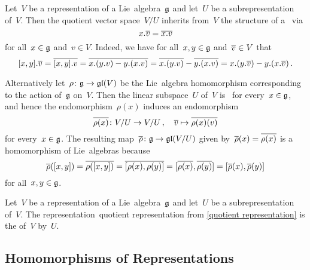 \begin{example}
  \label{quotient representation}
  Let~$V$ be a representation of a Lie~algebra~$\glie$ and let~$U$ be a subrepresentation of~$V$.
  Then the quotient vector space~$V/U$ inherits from~$V$ the structure of a~{\representation{$\glie$}} via
  \[
    x.\overline{v}
    =
    \overline{x.v}
  \]
  for all~$x \in \mathfrak{g}$ and~$v \in V$.
  Indeed, we have for all~$x, y \in \mathfrak{g}$ and~$\overline{v} \in V$ that
  \[
    [x,y].\overline{v}
    =
    \overline{[x,y].v}
    =
    \overline{x.(y.v) - y.(x.v)}
    =
    \overline{x.(y.v)} - \overline{y.(x.v)}
    =
    x.(y.\overline{v}) - y.(x.\overline{v}) \,.
  \]
  
  Alternatively let~$\rho \colon \mathfrak{g} \to \mathfrak{gl}(V)$ be the Lie~algebra homomorphism corresponding to the action of~$\glie$ on~$V$.
  Then the linear subspace~$U$ of~$V$ is~{} for every~$x \in \mathfrak{g}$, and hence the endomorphism~$\rho(x)$ induces an endomorphism
  \[
    \overline{\rho(x)}
    \colon
    V/U
    \to
    V/U \,,
    \quad
    \overline{v}
    \mapsto
    \overline{\rho(x)(v)}
  \]
  for every~$x \in \mathfrak{g}$.
  The resulting map~$\overline{\rho} \colon \mathfrak{g} \to \mathfrak{gl}(V/U)$ given by~$\overline{\rho}(x) = \overline{\rho(x)}$  is a homomorphism of Lie~algebras because
  \[
    \overline{\rho}([x,y])
    =
    \overline{\rho([x,y])}
    =
    \overline{[\rho(x), \rho(y)]}
    =
    [\overline{\rho(x)}, \overline{\rho(y)}]
    =
    [\overline{\rho}(x), \overline{\rho}(y)]
  \]
  for all~$x, y \in \mathfrak{g}$.
\end{example}


\begin{definition}
  Let~$V$ be a representation of a Lie~algebra~$\glie$ and let~$U$ be a subrepresentation of~$V$.
  The representation~\gls*{quotient representation} from \cref{quotient representation} is the  of~$V$ by~$U$.
\end{definition}





\subsection{Homomorphisms of Representations}


